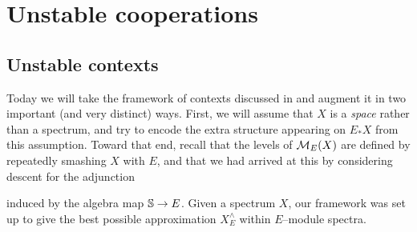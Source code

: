 
\chapter{Unstable cooperations}





\section{Unstable contexts}

Today we will take the framework of contexts discussed in  and augment it in two important (and very distinct) ways.  First, we will assume that $X$ is a \emph{space} rather than a spectrum, and try to encode the extra structure appearing on $E_* X$ from this assumption.  Toward that end, recall that the levels of $\context{E}(X)$ are defined by repeatedly smashing $X$ with $E$, and that we had arrived at this by considering descent for the adjunction
\begin{center}
\end{center}
induced by the algebra map $\S \to E$.  Given a spectrum $X$, our framework was set up to give the best possible approximation $X^\wedge_E$ within $E$--module spectra.

